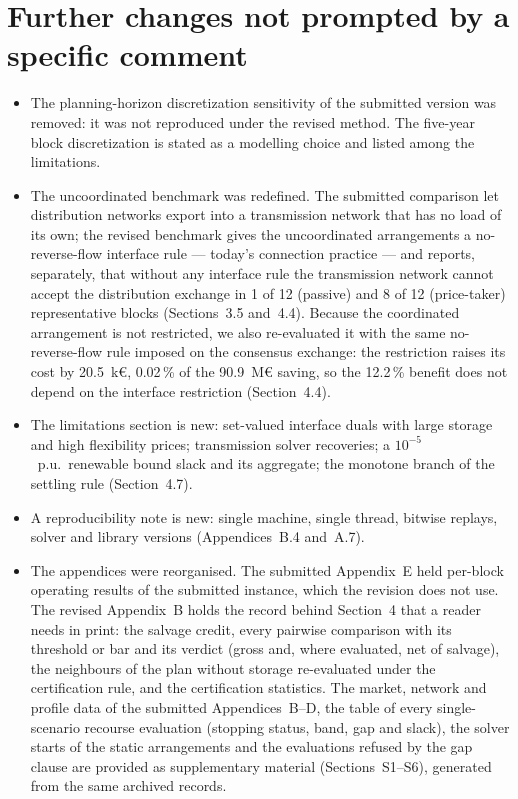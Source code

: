 \documentclass[11pt]{article}
\begin{document}
\section*{Further changes not prompted by a specific comment}

\begin{itemize}[leftmargin=*]
  \item The planning-horizon discretization sensitivity of the submitted version was removed: it was not reproduced under the revised method. The five-year block discretization is stated as a modelling choice and listed among the limitations.
  \item The uncoordinated benchmark was redefined. The submitted comparison let distribution networks export into a transmission network that has no load of its own; the revised benchmark gives the uncoordinated arrangements a no-reverse-flow interface rule --- today's connection practice --- and reports, separately, that without any interface rule the transmission network cannot accept the distribution exchange in 1 of 12 (passive) and 8 of 12 (price-taker) representative blocks (Sections~3.5 and~4.4). Because the coordinated arrangement is not restricted, we also re-evaluated it with the same no-reverse-flow rule imposed on the consensus exchange: the restriction raises its cost by 20.5~k\euro{}, 0.02\,\% of the 90.9~M\euro{} saving, so the 12.2\,\% benefit does not depend on the interface restriction (Section~4.4).
  \item The limitations section is new: set-valued interface duals with large storage and high flexibility prices; transmission solver recoveries; a $10^{-5}$~p.u.\ renewable bound slack and its aggregate; the monotone branch of the settling rule (Section~4.7).
  \item A reproducibility note is new: single machine, single thread, bitwise replays, solver and library versions (Appendices~B.4 and~A.7).
  \item The appendices were reorganised. The submitted Appendix~E held per-block operating results of the submitted instance, which the revision does not use. The revised Appendix~B holds the record behind Section~4 that a reader needs in print: the salvage credit, every pairwise comparison with its threshold or bar and its verdict (gross and, where evaluated, net of salvage), the neighbours of the plan without storage re-evaluated under the certification rule, and the certification statistics. The market, network and profile data of the submitted Appendices~B--D, the table of every single-scenario recourse evaluation (stopping status, band, gap and slack), the solver starts of the static arrangements and the evaluations refused by the gap clause are provided as supplementary material (Sections~S1--S6), generated from the same archived records.

\end{itemize}
\end{document}
